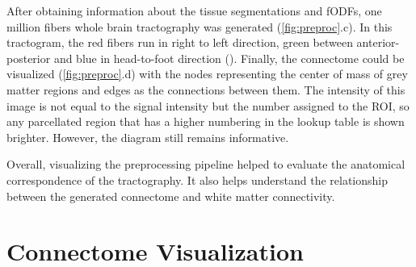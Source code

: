 \documentclass[msthesis.tex]{subfiles}
\begin{document}
After obtaining information about the tissue segmentations and fODFs, one million fibers whole brain tractography was generated (\autoref{fig:preproc}.c). In this tractogram, the red fibers run in right to left direction, green between anterior-posterior and blue in head-to-foot direction (\cite{obert2013evaluation}). Finally, the connectome could be visualized (\autoref{fig:preproc}.d) with the nodes representing the center of mass of grey matter regions and edges as the connections between them. The intensity of this image is not equal to the signal intensity but the number assigned to the ROI, so any parcellated region that has a higher numbering in the lookup table is shown brighter. However, the diagram still remains informative. 

Overall, visualizing the preprocessing pipeline helped to evaluate the anatomical correspondence of the tractography. It also helps understand the relationship between the generated connectome and white matter connectivity.

\section{Connectome Visualization}
\end{document}
